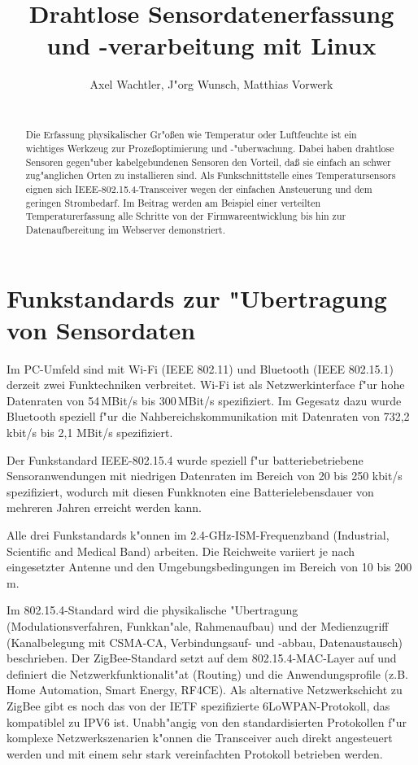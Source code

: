 \documentclass{clt2011}
\begin{document}
\title{Drahtlose Sensordatenerfassung und -verarbeitung mit Linux}
\author{Axel Wachtler, J"org Wunsch, Matthias Vorwerk\\
\\
}
\maketitle
\begin{abstract}
Die Erfassung physikalischer Gr"o\ss{}en wie Temperatur oder Luftfeuchte ist
ein wichtiges Werkzeug zur Proze\ss{}optimierung und -"uberwachung.
Dabei haben drahtlose Sensoren gegen"uber kabelgebundenen Sensoren den Vorteil,
da\ss{} sie einfach an schwer zug"anglichen Orten zu installieren sind.
Als Funkschnittstelle eines Temperatursensors eignen sich IEEE-802.15.4-Transceiver
wegen der einfachen Ansteuerung und dem geringen Strombedarf.
Im Beitrag werden am Beispiel einer verteilten Temperaturerfassung alle Schritte von
der Firmwareentwicklung bis hin zur Datenaufbereitung im Webserver demonstriert.
\end{abstract}

\section{Funkstandards zur "Ubertragung von Sensordaten}

Im PC-Umfeld sind  mit Wi-Fi (IEEE 802.11) und Bluetooth (IEEE 802.15.1) derzeit
zwei Funktechniken verbreitet.
Wi-Fi ist als Netzwerkinterface f"ur hohe Datenraten von 54\,MBit/s bis 300\,MBit/s spezifiziert.
Im Gegesatz dazu wurde Bluetooth speziell f"ur die Nahbereichskommunikation
mit Datenraten von 732,2 kbit/s bis 2,1 MBit/s spezifiziert.

Der Funkstandard IEEE-802.15.4 \cite{ieee154} wurde speziell f"ur
batteriebetriebene Sensoranwendungen mit niedrigen Datenraten im Bereich von
20 bis 250 kbit/s spezifiziert, wodurch mit diesen Funkknoten eine Batterielebensdauer
von mehreren Jahren erreicht werden kann.

Alle drei Funkstandards k"onnen im 2.4-GHz-ISM-Frequenzband (Industrial, Scientific and Medical Band)
\cite{ism} arbeiten. Die Reichweite variiert je nach eingesetzter Antenne und den Umgebungsbedingungen
im Bereich von 10 bis 200\,m.

Im 802.15.4-Standard wird die physikalische "Ubertragung (Modulationsverfahren, Funkkan"ale,
Rahmenaufbau) und der Medienzugriff (Kanalbelegung mit CSMA-CA, Verbindungs\-auf- und -abbau, Datenaustausch)
beschrieben.
Der ZigBee-Standard setzt auf dem 802.15.4-MAC-Layer auf und definiert die Netzwerkfunktionalit"at
(Routing) und die Anwendungsprofile (z.B. Home Automation, Smart Energy, RF4CE).
Als alternative Netzwerkschicht zu ZigBee gibt es noch das von der \textsf{IETF} spezifizierte 6LoWPAN-Protokoll,
das kompatiblel zu IPV6 ist.
Unabh"angig von den standardisierten Protokollen f"ur komplexe Netzwerkszenarien k"onnen die
Transceiver auch direkt angesteuert werden und mit einem sehr stark vereinfachten
Protokoll betrieben werden.
\end{document}
